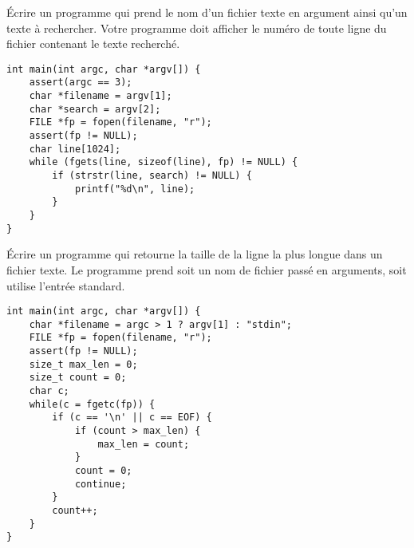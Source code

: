 \documentclass[french,a4paper,addpoints,11pt]{exam}
\begin{document}
\begin{questions}
\question Écrire un programme qui prend le nom d'un fichier texte en argument ainsi qu'un texte à rechercher. Votre programme doit afficher le numéro de toute ligne du fichier contenant le texte recherché.

\begin{solutionordottedlines}[10cm]
\begin{lstlisting}
int main(int argc, char *argv[]) {
    assert(argc == 3);
    char *filename = argv[1];
    char *search = argv[2];
    FILE *fp = fopen(filename, "r");
    assert(fp != NULL);
    char line[1024];
    while (fgets(line, sizeof(line), fp) != NULL) {
        if (strstr(line, search) != NULL) {
            printf("%d\n", line);
        }
    }
}
\end{lstlisting}
\end{solutionordottedlines}

\question Écrire un programme qui retourne la taille de la ligne la plus longue dans un fichier texte. Le programme prend soit un nom de fichier passé en arguments, soit utilise l'entrée standard.

\begin{solutionordottedlines}[10cm]
\begin{lstlisting}
int main(int argc, char *argv[]) {
    char *filename = argc > 1 ? argv[1] : "stdin";
    FILE *fp = fopen(filename, "r");
    assert(fp != NULL);
    size_t max_len = 0;
    size_t count = 0;
    char c;
    while(c = fgetc(fp)) {
        if (c == '\n' || c == EOF) {
            if (count > max_len) {
                max_len = count;
            }
            count = 0;
            continue;
        }
        count++;
    }
}
\end{lstlisting}
\end{solutionordottedlines}


\end{questions}
\end{document}
